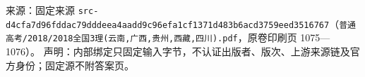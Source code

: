 
\begin{gktip}
来源：固定来源 \texttt{src-d4cfa7d96fddac79dddeea4aadd9c96efa1cf1371d483b6acd3759eed3516767}（\texttt{普通高考/2018/2018全国3理(云南,广西,贵州,西藏,四川).pdf}，原卷印刷页 1075—1076）。
声明：内部绑定只固定输入字节，不认证出版者、版次、上游来源链及官方身份；固定源不附答案页。
\end{gktip}

\par\medskip


